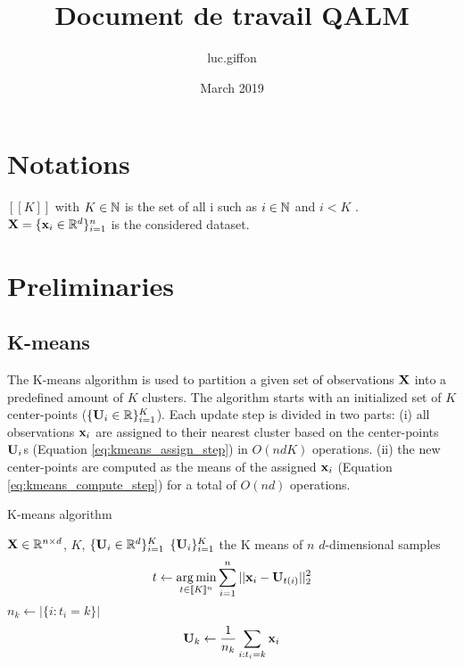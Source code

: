\documentclass{article}
\title{Document de travail QALM}
\author{luc.giffon }
\date{March 2019}
\begin{document}
\maketitle

\section{Notations}

$[\![K]\!]$ with $K \in {\mathbb{N}}$ is the set of all i such as $i \in {\mathbb{N}}$ and $i < K$ . ${\mathbf{X}} = \{{\mathbf{x}}_i \in \mathbb{R}^d\}_{i=1}^n$ is the considered dataset.

\section{Preliminaries}

\subsection{K-means}

The K-means algorithm is used to partition a given set of observations ${\mathbf{X}}$ into a predefined amount of $K$ clusters. The algorithm starts with an initialized set of $K$ center-points ($\{{\mathbf{U}}_i \in \mathbb{R}\}_{i=1}^{K}$). Each update step is divided in two parts: (i) all observations ${\mathbf{x}}_i$ are assigned to their nearest cluster based on the center-points ${\mathbf{U}}_i$s (Equation \ref{eq:kmeans_assign_step}) in $O(ndK)$ operations. (ii) the new center-points are computed as the means of the assigned ${\mathbf{x}}_i$ (Equation \ref{eq:kmeans_compute_step}) for a total of $O(nd)$ operations.

\begin{algorithm}
\caption{K-means algorithm}
\begin{algorithmic}


\REQUIRE ${\mathbf{X}} \in \mathbb{R}^{n \times d}$, $K$, $\{{\mathbf{U}}_i \in \mathbb{R}^d\}_{i=1}^{K}$
\ENSURE $\{{\mathbf{U}}_i\}_{i=1}^{K}$ the K means of $n$ $d$-dimensional samples
\REPEAT
\STATE \begin{equation}
\label{eq:kmeans_assign_step}
t \leftarrow \operatorname*{arg\,min}_{t \in [\![K]\!]^n} \sum_{i=1}^{n} {||{\mathbf{x}}_i - {\mathbf{U}}_{t(i)}||_2^2}
\end{equation}
\STATE $n_k \leftarrow |\{i: t_i=k\}|$
\STATE \begin{equation}
\label{eq:kmeans_compute_step}
{\mathbf{U}}_k \leftarrow \frac{1}{n_k} \sum_{i: t_i = k} {{\mathbf{x}}_i}
\end{equation}
\ENDFOR
{}
\end{algorithmic}
\end{algorithm}
\end{document}
